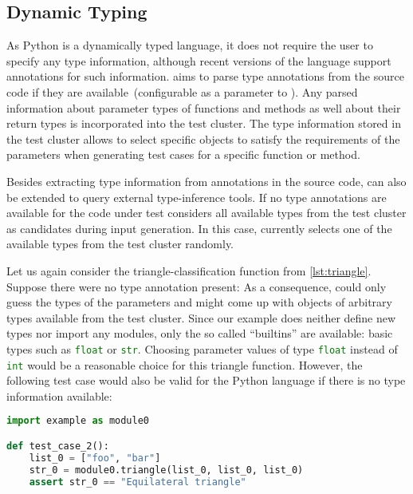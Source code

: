 \subsection{Dynamic Typing}\label{sec:approach-typing}

As Python is a dynamically typed language,
it does not require the user to specify any type information,
although recent versions of the language support annotations for such information.
%
\Pynguin aims to parse type annotations
from the source code if they are available~(configurable as a parameter
to \pynguin).
%
Any parsed information about parameter types of functions and methods
as well about their return types is incorporated into the test cluster.
%
The type information stored in the test cluster
allows \pynguin to select specific objects
to satisfy the requirements of the parameters
when generating test cases for a specific function or method.
%

Besides extracting type information from annotations in the source code,
\pynguin can also be extended to query external type-inference tools.
If no type annotations are available for the code under test
\pynguin considers all available types from the test cluster
as candidates during input generation.
%
In this case,
\pynguin currently selects one of the available types
from the test cluster randomly.
%
%

Let us again consider the triangle-classification function
from \cref{lst:triangle}.
%
Suppose there were no type annotation present:
%
As a consequence,
\pynguin could only guess the types of the parameters
and might come up with objects of arbitrary types
available from the test cluster.
%
Since our example does neither define new types
nor import any modules,
only the so called \enquote{builtins} are available:
basic types such as \lstinline[language=python]!float!
or \lstinline[language=python]!str!.
%
Choosing parameter values of type \lstinline[language=python]!float! instead of
\lstinline[language=python]!int! would be a reasonable choice for this triangle
function.
%
However,
the following test case would also be valid for the Python language if
there is no type information available:
%
\begin{lstlisting}[language=python]
import example as module0

def test_case_2():
    list_0 = ["foo", "bar"]
    str_0 = module0.triangle(list_0, list_0, list_0)
    assert str_0 == "Equilateral triangle"
\end{lstlisting}

